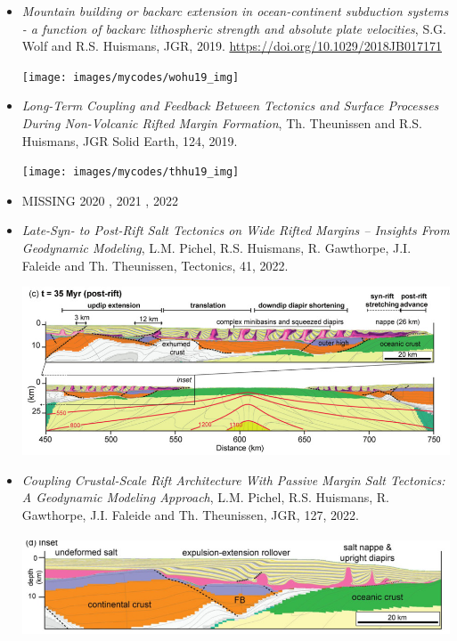 \begin{itemize}
\item {\it Mountain building or backarc extension in ocean-continent subduction systems - a function of
backarc lithospheric strength and absolute plate velocities}, 
S.G. Wolf and R.S. Huismans, JGR, 2019. \url{https://doi.org/10.1029/2018JB017171} \cite{wohu19}

\begin{center}
\texttt{[image: images/mycodes/wohu19\_img]}
\end{center}

\item {\it Long-Term Coupling and Feedback Between Tectonics and Surface Processes During Non-Volcanic
Rifted Margin Formation},  Th. Theunissen and R.S. Huismans, JGR Solid Earth, 124, 2019. \cite{thhu19}

\begin{center}
\texttt{[image: images/mycodes/thhu19\_img]}
\end{center}

\item MISSING 2020 , 2021 , 2022

\item {\it Late-Syn- to Post-Rift Salt Tectonics on Wide Rifted
Margins -- Insights From Geodynamic Modeling}, 
L.M. Pichel, R.S. Huismans, R. Gawthorpe, J.I. Faleide and Th. Theunissen, Tectonics, 41, 2022. \cite{pihg22a}
\begin{center}
\includegraphics[height=5cm]{images/mycodes/pihg22a_img}
\end{center}

\item {\it Coupling Crustal-Scale Rift Architecture With Passive Margin
Salt Tectonics: A Geodynamic Modeling Approach}, 
L.M. Pichel, R.S. Huismans, R. Gawthorpe, J.I. Faleide and Th. Theunissen, JGR, 127, 2022. \cite{pihg22b}
\begin{center}
\includegraphics[height=3cm]{images/mycodes/pihg22b_img}
\end{center}


\end{itemize}
